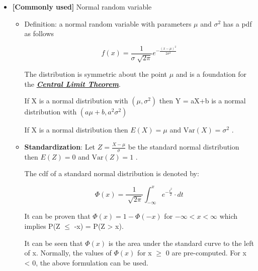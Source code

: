 \documentclass[12pt]{report}
\renewcommand{\_}{\kern-1.5pt\textunderscore\kern-1.5pt}
\begin{document}
\begin{itemize}
	\item \textbf{[Commonly used]} Normal random variable\par

\begin{itemize}
	\item Definition: a normal random variable with parameters  \(  \mu  \)  and  \(  \sigma ^{2} \)  has a pdf as follows\par

 \[ f \left( x \right) =\frac{1}{ \sigma \sqrt[]{2 \pi }}e^{-\frac{ \left( x- \mu  \right) ^{2}}{2 \sigma ^{2}}} \] \par

The distribution is symmetric about the point  \(  \mu  \)  and is a foundation for the \textbf{\textit{\uline{Central Limit Theorem}}}.\par

If X is a normal distribution with  \(  \left(  \mu , \sigma ^{2} \right)  \)  then Y = aX+b is a normal distribution with  \(  \left( a \mu +b,a^{2} \sigma ^{2} \right)  \) \par

If X is a normal distribution then  \( E \left( X \right) = \mu  \)  and  \( \mathrm{Var} \left( X \right) = \sigma ^{2} \) .\par

	\item \textbf{Standardization}: Let  \( Z=\frac{X- \mu }{ \sigma } \)  be the standard normal distribution then  \( E \left( Z \right) =0 \)  and  \( \mathrm{Var} \left( Z \right) =1 \) .\par

The cdf of a standard normal distribution is denoted by:\par

 \[  \Phi  \left( x \right) =\frac{1}{\sqrt[]{2 \pi }} \int _{-\infty}^{x}e^{-\frac{t^{2}}{2}} \cdot dt \] \par

It can be proven that  \(  \Phi  \left( x \right) =1- \Phi  \left( -x \right)  \)  for  \( -\infty<x<\infty \)  which implies P(Z $ \leq $  -x) = P(Z > x). \par

It can be seen that  \(  \Phi  \left( x \right)  \)  is the area under the standard curve to the left of x. Normally, the values of  \(  \Phi  \left( x \right)  \)  for x $ \geq $  0 are pre-computed. For x < 0, the above formulation can be used.\par


\end{itemize}
\end{itemize}
\end{document}
